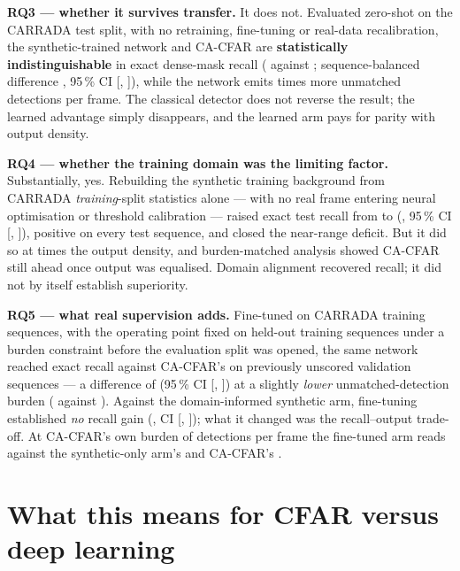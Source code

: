 \textbf{RQ3 --- whether it survives transfer.} It does not. Evaluated zero-shot on the CARRADA test
split, with no retraining, fine-tuning or real-data recalibration, the synthetic-trained network and
CA-CFAR are \textbf{statistically indistinguishable} in exact dense-mask recall (\RoneTinyCNN{}
against \RoneCFARCA{}; sequence-balanced difference \RoneDelta{}, 95\,\% CI
[\RoneCIlo{}, \RoneCIhi{}]), while the network emits \RoneBurdenRatio{} times more unmatched
detections per frame. The classical detector does not reverse the result; the learned advantage
simply disappears, and the learned arm pays for parity with output density.

\textbf{RQ4 --- whether the training domain was the limiting factor.} Substantially, yes. Rebuilding
the synthetic training background from CARRADA \emph{training}-split statistics alone --- with no
real frame entering neural optimisation or threshold calibration --- raised exact test recall from
\CiTestOrig{} to \CiTestNew{} (\CiTestDelta{}, 95\,\% CI [\CiTestCIlo{}, \CiTestCIhi{}]), positive on
every test sequence, and closed the near-range deficit. But it did so at \CiTestBurdenRatio{} times
the output density, and burden-matched analysis showed CA-CFAR still ahead once output was equalised.
Domain alignment recovered recall; it did not by itself establish superiority.

\textbf{RQ5 --- what real supervision adds.} Fine-tuned on CARRADA training sequences, with the
operating point fixed on held-out training sequences under a burden constraint before the evaluation
split was opened, the same network reached exact recall \FtValFt{} against CA-CFAR's \FtValCFAR{} on
previously unscored validation sequences --- a difference of \FtDelta{} (95\,\% CI
[\FtCIlo{}, \FtCIhi{}]) at a slightly \emph{lower} unmatched-detection burden (\FtValBurdenFt{}
against \FtValBurdenCFAR{}). Against the domain-informed synthetic arm, fine-tuning established
\emph{no} recall gain (\FtVsCiDelta{}, CI [\FtVsCiCIlo{}, \FtVsCiCIhi{}]); what it changed was the
recall--output trade-off. At CA-CFAR's own burden of \FtMatchedBurden{} detections per frame the
fine-tuned arm reads \FtMatchedFt{} against the synthetic-only arm's \FtMatchedCi{} and CA-CFAR's
\FtMatchedCFAR{}.

\section*{What this means for CFAR versus deep learning}

